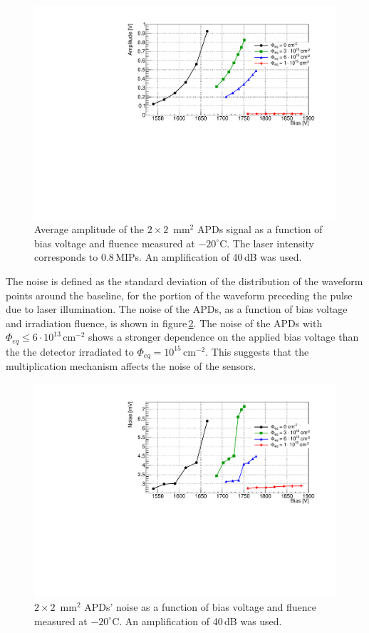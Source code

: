 \documentclass[3p,preprint,twocolumn]{elsarticle}
\begin{document}
\begin{figure}
  \centering
  \includegraphics[width = \columnwidth]{ampli2x2APDs}
  \caption{Average amplitude of the $2 \times 2$~mm$^2$ APDs signal as a function of bias voltage and fluence measured at $-20^\circ$C. The laser intensity corresponds to 0.8\,MIPs. An amplification of 40\,dB was used.}
  \label{fig:ampli2x2}
\end{figure}

The noise is defined as the standard deviation of the distribution of the waveform points around the baseline, for the portion of the waveform preceding the pulse due to laser illumination.
The noise of the APDs, as a function of bias voltage and irradiation fluence, is shown in figure\,\ref{fig:noise2x2}.
The noise of the APDs with $\Phi_{eq} \leq 6 \cdot 10^{13}$\,cm$^{-2}$ shows a stronger dependence on the applied bias voltage than the the detector irradiated to $\Phi_{eq} = 10^{15}$\,cm$^{-2}$.
This suggests that the multiplication mechanism affects the noise of the sensors.

\begin{figure}
  \centering
  \includegraphics[width = \columnwidth]{noise2x2APDs}
  \caption{$2 \times 2$~mm$^2$ APDs' noise as a function of bias voltage and fluence measured at $-20^\circ$C. An amplification of 40\,dB was used.}
  \label{fig:noise2x2}
\end{figure}
\end{document}
